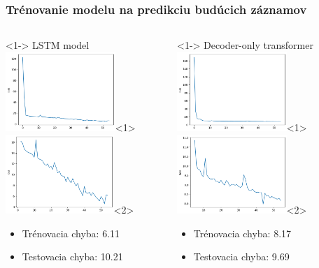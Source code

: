 \documentclass[slovak]{beamer}
\begin{document}
\begin{frame}
	\frametitle{Trénovanie modelu na predikciu budúcich záznamov}

	\begin{columns}[T]%
		\begin{column}{.48\textwidth}<1->%
			LSTM model 
			\includegraphics[height=3cm]{images/rnn_train_loss_1.png}<1>
			\includegraphics[height=3cm]{images/rnn_train_loss_2.png}<2>
			
			\begin{itemize}
				\item<1-> Trénovacia chyba: 6.11
				\item<1-> Testovacia chyba: 10.21
			\end{itemize}
		\end{column}
		\hfill%
		\begin{column}{.48\textwidth}<1->%
			Decoder-only transformer  
			\includegraphics[height=3cm]{images/trans_train_loss_1.png}<1>
			\includegraphics[height=3cm]{images/trans_train_loss_2.png}<2>
			
			\begin{itemize} 
				\item<1-> Trénovacia chyba: 8.17
				\item<1-> Testovacia chyba: 9.69
			\end{itemize}
		\end{column}  
	\end{columns}
\end{frame}
\end{document}
